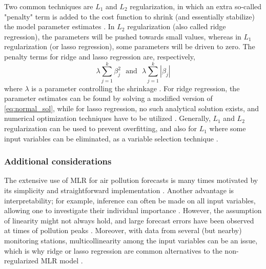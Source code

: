 Two common techniques are $L_1$ and  $L_2$ regularization, in which an extra so-called "penalty" term is added to the cost function to shrink (and essentially stabilize) the model parameter estimates \cite{smlbook}. In $L_2$ regularization (also called ridge regression), the parameters will be pushed towards small values, whereas in $L_1$ regularization (or lasso regression), some parameters will be driven to zero. 
The penalty terms for ridge and lasso regression are, respectively, 
$$\lambda \sum_{j=1}^{k}\beta_{j}^2\:\:\: \text{and}\:\:\: \lambda \sum_{j=1}^{k}|\beta_{j}|$$
where $\lambda$ is a parameter controlling the shrinkage \cite{smlbook}. For ridge regression, the parameter estimates can be found by solving a modified version of \vref{eq:normal_sol}, while for lasso regression, no such analytical solution exists, and numerical optimization techniques have to be utilized \cite{smlbook}. 
Generally, $L_1$ and $L_2$ regularization can be used to prevent overfitting, and also for $L_1$ where some input variables can be eliminated, as a variable selection technique \cite{smlbook}. 

\subsubsection{Additional considerations}
The extensive use of MLR for air pollution forecasts is many times motivated by its simplicity and straightforward implementation \cite{atmos7020015}. Another advantage is interpretability; for example, inference can often be made on all input variables, allowing one to investigate their individual importance \cite{Montgomery2012}. However, the assumption of linearity might not always hold, and large forecast errors have been observed at times of pollution peaks \cite{atmos7020015}. Moreover, with data from several (but nearby) monitoring stations, multicollinearity among the input variables can be an issue, which is why ridge or lasso regression are common alternatives to the non-regularized MLR model \cite{atmos7020015}. 


